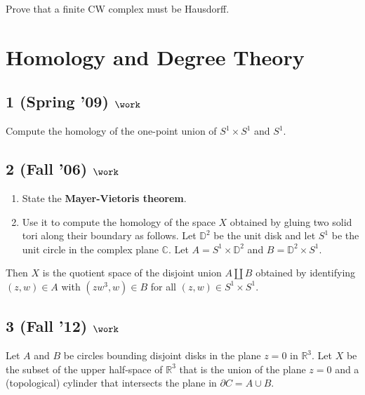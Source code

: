 Prove that a finite CW complex must be Hausdorff.

\hypertarget{homology-and-degree-theory}{%
\section{Homology and Degree Theory}\label{homology-and-degree-theory}}

\hypertarget{spring-09-work-3}{%
\subsection{\texorpdfstring{1 (Spring '09)
\(\work\)}{1 (Spring '09) \textbackslash work}}\label{spring-09-work-3}}

Compute the homology of the one-point union of \(S^1 \times S^1\) and
\(S^1\).

\hypertarget{fall-06-work-1}{%
\subsection{\texorpdfstring{2 (Fall '06)
\(\work\)}{2 (Fall '06) \textbackslash work}}\label{fall-06-work-1}}

\begin{enumerate}
\def\labelenumi{\alph{enumi}.}
\item
  State the \textbf{Mayer-Vietoris theorem}.
\item
  Use it to compute the homology of the space \(X\) obtained by gluing
  two solid tori along their boundary as follows. Let \({\mathbb{D}}^2\)
  be the unit disk and let \(S^1\) be the unit circle in the complex
  plane \({\mathbb{C}}\). Let \(A = S^1 \times {\mathbb{D}}^2\) and
  \(B = {\mathbb{D}}^2 \times S^1\).
\end{enumerate}

Then \(X\) is the quotient space of the disjoint union \(A {\coprod}B\)
obtained by identifying \((z, w) \in A\) with \((zw^3 , w) \in B\) for
all \((z, w) \in S^1 \times S^1\).

\hypertarget{fall-12-work-2}{%
\subsection{\texorpdfstring{3 (Fall '12)
\(\work\)}{3 (Fall '12) \textbackslash work}}\label{fall-12-work-2}}

Let \(A\) and \(B\) be circles bounding disjoint disks in the plane
\(z = 0\) in \({\mathbb{R}}^3\). Let \(X\) be the subset of the upper
half-space of \({\mathbb{R}}^3\) that is the union of the plane
\(z = 0\) and a (topological) cylinder that intersects the plane in
\(\partial C = A \cup B\).


